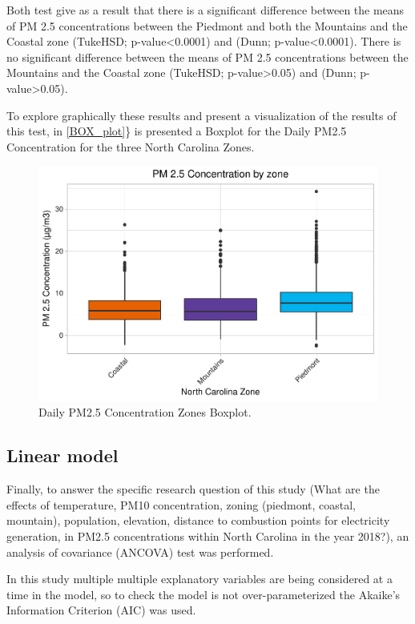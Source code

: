 \documentclass[12pt,]{article}
\begin{document}
Both test give as a result that there is a significant difference
between the means of PM 2.5 concentrations between the Piedmont and both
the Mountains and the Coastal zone (TukeHSD; p-value\textless{}0.0001)
and (Dunn; p-value\textless{}0.0001). There is no significant difference
between the means of PM 2.5 concentrations between the Mountains and the
Coastal zone (TukeHSD; p-value\textgreater{}0.05) and (Dunn;
p-value\textgreater{}0.05).

To explore graphically these results and present a visualization of the
results of this test, in \autoref{BOX_plot}\} is presented a Boxplot for
the Daily PM2.5 Concentration for the three North Carolina Zones.

\begin{figure}
\centering
\includegraphics{Raby_ENV872_Project_files/figure-latex/unnamed-chunk-55-1.pdf}
\caption{Daily PM2.5 Concentration Zones Boxplot. \label{BOX_plot}}
\end{figure}

\subsection{Linear model}\label{linear-model}

Finally, to answer the specific research question of this study (What
are the effects of temperature, PM10 concentration, zoning (piedmont,
coastal, mountain), population, elevation, distance to combustion points
for electricity generation, in PM2.5 concentrations within North
Carolina in the year 2018?), an analysis of covariance (ANCOVA) test was
performed.

In this study multiple multiple explanatory variables are being
considered at a time in the model, so to check the model is not
over-parameterized the Akaike's Information Criterion (AIC) was used.
\end{document}
